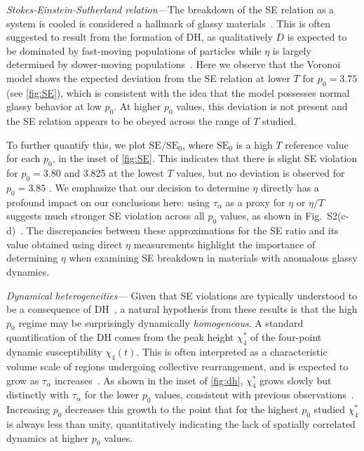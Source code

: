 \documentclass[amsmath,amssymb,prl,reprint,twocolumn]{revtex4-2}
\begin{document}
\emph{Stokes-Einstein-Sutherland relation---}The breakdown of the SE relation as a system is cooled is considered a hallmark of glassy materials~\cite{Ediger2000}.
This is often suggested to result from the formation of DH, as qualitatively $D$ is expected to be dominated by fast-moving populations of particles while $\eta$ is largely determined by slower-moving populations~\cite{Bordat2003,Sengupta2014,Pastore2015,Parmar2017}.
Here we observe that the Voronoi model shows the expected deviation from the SE relation at lower $T$ for $p_0=3.75$ (see \cref{fig:SE}), which is consistent with the idea that the model possesses normal glassy behavior at low $p_0$.
At higher $p_0$ values, this deviation is not present and the SE relation appears to be obeyed across the range of $T$ studied. 


To further quantify this, we plot $\text{SE}/\text{SE}_0$, where $\text{SE}_0$ is a high $T$ reference value for each $p_0$, in the inset of \cref{fig:SE}.
This indicates that there is slight SE violation for $p_0=3.80$ and 3.825 at the lowest $T$ values, but no deviation is observed for $p_0=3.85$ .
We emphasize that our decision to determine $\eta$ directly has a profound impact on our conclusions here: using $\tau_{\alpha}$ as a proxy for $\eta$ or $\eta/T$ suggests much stronger SE violation across all $p_0$ values, as shown in Fig.~S2(c-d)~\cite{Supp}.
The discrepancies between these approximations for the SE ratio and its value obtained using direct $\eta$ measurements highlight the importance of determining $\eta$ when examining SE breakdown in materials with anomalous glassy dynamics.


\emph{Dynamical heterogeneities---} Given that SE violations are typically understood to be a consequence of DH~\cite{Ediger2000,Berthier2011DHBook}, a natural hypothesis from these results is that the high $p_0$ regime may be surprisingly dynamically \emph{homogeneous}.
A standard quantification of the DH comes from the peak height $\chi_4^*$ of the four-point dynamic susceptibility $\chi_4(t)$.
This is often interpreted as a characteristic volume scale of regions undergoing collective rearrangement, and is expected to grow as $\tau_{\alpha}$ increases~\cite{Berthier2011DHBook}.
As shown in the inset of \cref{fig:dh}, $\chi_4^*$ grows slowly but distinctly with $\tau_{\alpha}$ for the lower $p_0$ values, consistent with previous observations~\cite{Sussman2018EPL,Li2021}.
Increasing $p_0$ decreases this growth to the point that for the highest $p_0$ studied $\chi_4^*$ is always less than unity, quantitatively indicating the lack of spatially correlated dynamics at higher $p_0$ values.
\end{document}
